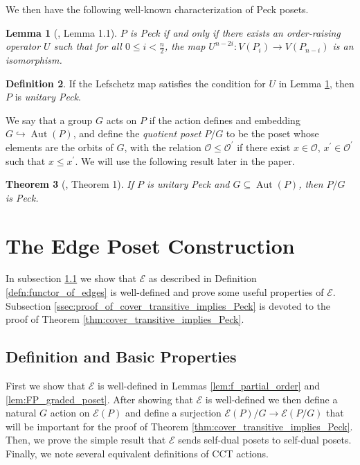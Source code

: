 \documentclass[10 pt]{amsart}
\theoremstyle{plain}
\newtheorem{thm}{Theorem}[section]
\newtheorem{lem}[thm]{Lemma}
\theoremstyle{definition}
\newtheorem{defn}[thm]{Definition}
\theoremstyle{remark}
\numberwithin{equation}{section}
\newcommand\ssec{\subsection}
\begin{document}
\noindent We then have the following well-known characterization of Peck posets.

\begin{lem}[\cite{weyl_groups_stanley}, Lemma 1.1]\label{lem:Peck_poset_characterization}
$P$ is Peck if and only if there exists an order-raising operator $U$ such that for all $0\le i < \frac{n}{2}$, the map $U^{n-2i}\colon V(P_i)\rightarrow V(P_{n-i})$ is an isomorphism.
\end{lem}

\begin{defn}
If the Lefschetz map satisfies the condition for $U$ in Lemma \ref{lem:Peck_poset_characterization}, then $P$ is \textit{unitary Peck}.
\end{defn}


We say that a group $G$ acts on $P$ if the action defines and embedding $G\hookrightarrow \operatorname{Aut}(P)$, and define the \textit{quotient poset} $P/G$ to be the poset whose elements are the orbits of $G$, with the relation $\mathcal{O}\le \mathcal{O}^\prime$ if there exist $x\in \mathcal{O}$, $x^\prime\in \mathcal{O}^\prime$ such that $x\le x^\prime$.  We will use the following result later in the paper.

\begin{thm}[\cite{quotients_stanley}, Theorem 1]
\label{thm:quotients_of_unitary_peck_posets}
If $P$ is unitary Peck and $G\subseteq\operatorname{Aut}(P)$, then $P/G$ is Peck.
\end{thm}



\section{The Edge Poset Construction}
\label{sec:functor_of_edges}

In subsection \ref{ssec:definition_and_basic_properties} we show that $\mathcal E$ as described in Definition \ref{defn:functor_of_edges} is well-defined and prove some useful properties of $\mathcal E$.  Subsection \ref{ssec:proof_of_cover_transitive_implies_Peck} is devoted to the proof of Theorem \ref{thm:cover_transitive_implies_Peck}.


\ssec{Definition and Basic Properties}

\label{ssec:definition_and_basic_properties}
First we show that $\mathcal{E}$ is well-defined in Lemmas \ref{lem:f_partial_order} and \ref{lem:FP_graded_poset}.  After showing that $\mathcal E$ is well-defined we then define a natural $G$ action on $\mathcal E(P)$ and define a surjection $\mathcal E(P)/G\rightarrow \mathcal E(P/G)$ that will be important for the proof of Theorem \ref{thm:cover_transitive_implies_Peck}. Then, we prove the simple result that $\mathcal E$ sends self-dual posets to self-dual posets. Finally, we note several equivalent definitions of CCT actions.
\end{document}
